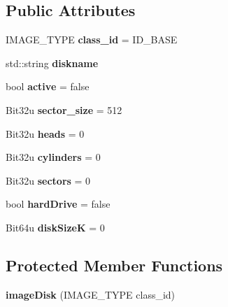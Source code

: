 \subsection*{Public Attributes}
\begin{DoxyCompactItemize}
\item 
\hypertarget{classimageDisk_a594ee035ea6bf97cf39808c128b02623}{I\-M\-A\-G\-E\-\_\-\-T\-Y\-P\-E {\bfseries class\-\_\-id} = I\-D\-\_\-\-B\-A\-S\-E}\label{classimageDisk_a594ee035ea6bf97cf39808c128b02623}

\item 
\hypertarget{classimageDisk_a05e629958277f26ed5a65cbf5e6fd193}{std\-::string {\bfseries diskname}}\label{classimageDisk_a05e629958277f26ed5a65cbf5e6fd193}

\item 
\hypertarget{classimageDisk_a58c8bf6765666eee5924a0df9b02a8b8}{bool {\bfseries active} = false}\label{classimageDisk_a58c8bf6765666eee5924a0df9b02a8b8}

\item 
\hypertarget{classimageDisk_a7550e00e3553d110ba1b0851178d8157}{Bit32u {\bfseries sector\-\_\-size} = 512}\label{classimageDisk_a7550e00e3553d110ba1b0851178d8157}

\item 
\hypertarget{classimageDisk_a725ce0c18709434c03d913f12418605f}{Bit32u {\bfseries heads} = 0}\label{classimageDisk_a725ce0c18709434c03d913f12418605f}

\item 
\hypertarget{classimageDisk_a408e3710449fc535836dea5deb51342a}{Bit32u {\bfseries cylinders} = 0}\label{classimageDisk_a408e3710449fc535836dea5deb51342a}

\item 
\hypertarget{classimageDisk_aa301426df1ed93f8804890500ae137ce}{Bit32u {\bfseries sectors} = 0}\label{classimageDisk_aa301426df1ed93f8804890500ae137ce}

\item 
\hypertarget{classimageDisk_a24521e7464982eb8b0cf93c104981a78}{bool {\bfseries hard\-Drive} = false}\label{classimageDisk_a24521e7464982eb8b0cf93c104981a78}

\item 
\hypertarget{classimageDisk_a5d19bf7107726cbe58f2d2d9b4b71a12}{Bit64u {\bfseries disk\-Size\-K} = 0}\label{classimageDisk_a5d19bf7107726cbe58f2d2d9b4b71a12}

\end{DoxyCompactItemize}
\subsection*{Protected Member Functions}
\begin{DoxyCompactItemize}
\item 
\hypertarget{classimageDisk_ac50b5252fd284058a8fa500b905853d1}{{\bfseries image\-Disk} (I\-M\-A\-G\-E\-\_\-\-T\-Y\-P\-E class\-\_\-id)}\label{classimageDisk_ac50b5252fd284058a8fa500b905853d1}

\end{DoxyCompactItemize}
